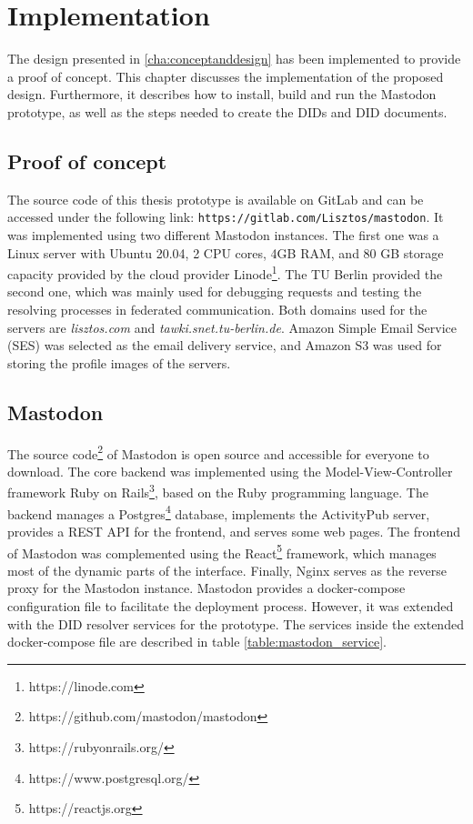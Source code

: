 \chapter{Implementation}
\label{cha:implementation}

The design presented in \ref{cha:conceptanddesign} has been implemented to provide a proof of concept. This chapter discusses the implementation of the proposed design. Furthermore, it describes how to install, build and run the Mastodon prototype, as well as the steps needed to create the DIDs and DID documents. 

\section{Proof of concept}

The source code of this thesis prototype is available on GitLab and can be accessed under the following link: \verb|https://gitlab.com/Lisztos/mastodon|. It was implemented using two different Mastodon instances. The first one was a Linux server with Ubuntu 20.04, 2 CPU cores,  4GB RAM, and 80 GB storage capacity provided by the cloud provider Linode\footnote{https://linode.com}. The TU Berlin provided the second one, which was mainly used for debugging requests and testing the resolving processes in federated communication. Both domains used for the servers are \emph{lisztos.com} and \emph{tawki.snet.tu-berlin.de}. Amazon Simple Email Service (SES) was selected as the email delivery service, and Amazon S3 was used for storing the profile images of the servers. 

\section{Mastodon}

The source code\footnote{https://github.com/mastodon/mastodon} of Mastodon is open source and accessible for everyone to download. The core backend was implemented using the Model-View-Controller framework Ruby on Rails\footnote{https://rubyonrails.org/}, based on the Ruby programming language. The backend manages a Postgres\footnote{https://www.postgresql.org/} database, implements the ActivityPub server, provides a REST API for the frontend, and serves some web pages. The frontend of Mastodon was complemented using the React\footnote{https://reactjs.org} framework, which manages most of the dynamic parts of the interface. Finally, Nginx serves as the reverse proxy for the Mastodon instance.  
Mastodon provides a docker-compose configuration file to facilitate the deployment process. However, it was extended with the DID resolver services for the prototype. The services inside the extended docker-compose file are described in table \ref{table:mastodon_service}.

